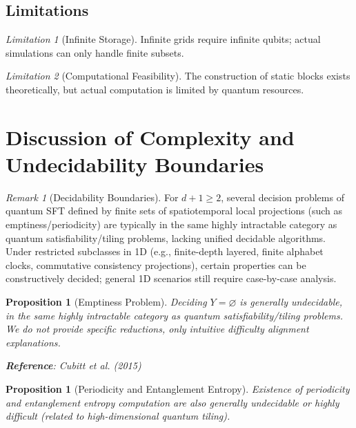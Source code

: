 \documentclass[11pt]{article}
\newtheorem{proposition}[theorem]{Proposition}
\theoremstyle{definition}
\theoremstyle{remark}
\newtheorem{remark}[theorem]{Remark}
\newtheorem{limitation}{Limitation}
\begin{document}
\subsection{Limitations}

\begin{limitation}[Infinite Storage]
Infinite grids require infinite qubits; actual simulations can only handle finite subsets.
\end{limitation}

\begin{limitation}[Computational Feasibility]
The construction of static blocks exists theoretically, but actual computation is limited by quantum resources.
\end{limitation}

\section{Discussion of Complexity and Undecidability Boundaries}\label{sec:complexity}

\begin{remark}[Decidability Boundaries]
For \( d+1\ge2 \), several decision problems of quantum SFT defined by finite sets of spatiotemporal local projections (such as emptiness/periodicity) are typically in the same highly intractable category as quantum satisfiability/tiling problems, lacking unified decidable algorithms. Under restricted subclasses in 1D (e.g., finite-depth layered, finite alphabet clocks, commutative consistency projections), certain properties can be constructively decided; general 1D scenarios still require case-by-case analysis.
\end{remark}

\begin{proposition}[Emptiness Problem]\label{prop:qemptiness}
Deciding \( Y = \varnothing \) is generally undecidable, in the same highly intractable category as quantum satisfiability/tiling problems. We do not provide specific reductions, only intuitive difficulty alignment explanations.

\textbf{Reference}: Cubitt et al. (2015)
\end{proposition}

\begin{proposition}[Periodicity and Entanglement Entropy]\label{prop:qperiod}
Existence of periodicity and entanglement entropy computation are also generally undecidable or highly difficult (related to high-dimensional quantum tiling).
\end{proposition}
\end{document}
